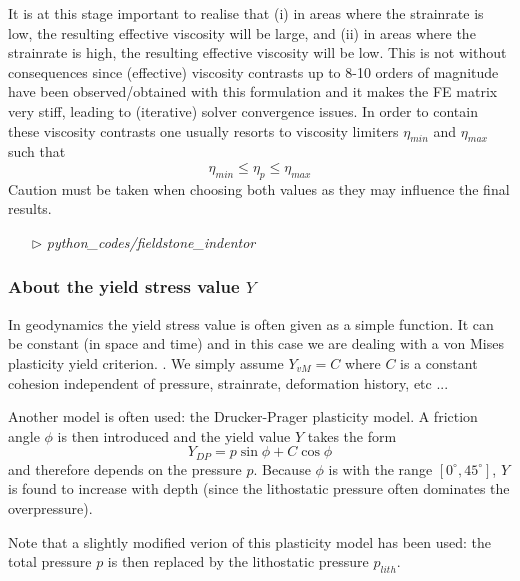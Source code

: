 It is at this stage important to realise that (i) in areas where the strainrate is low, the resulting effective viscosity will be large, and 
(ii) in areas where the strainrate is high, the resulting effective viscosity will be low. This is not without consequences since 
(effective) viscosity contrasts up to 8-10 orders of magnitude have been observed/obtained with this formulation and it makes the FE 
matrix very stiff, leading to (iterative) solver convergence issues.
In order to contain these viscosity contrasts one usually resorts to viscosity limiters $\eta_{min}$ and $\eta_{max}$ such that 
\[
\eta_{min} \leq \eta_p \leq \eta_{max}
\]
Caution must be taken when choosing both values as they may influence the final results.


\begin{mdframed}[backgroundcolor=green!5]
\begin{itemize}
\item[$\triangleright$] {\sl python\_codes/fieldstone\_indentor}
\end{itemize}
\end{mdframed}


\subsubsection{About the yield stress value $Y$}

In geodynamics the yield stress value is often given as a simple function. 
It can be constant (in space and time) and in this case we are dealing with a von Mises plasticity yield criterion. 
. We simply assume $Y_{vM}=C$ where $C$ is a constant cohesion independent of pressure, strainrate,
deformation history, etc ... 

Another model is often used: the Drucker-Prager plasticity model. 
A friction angle $\phi$ is then introduced and the yield value $Y$ takes the form
\[
Y_{DP}=p \sin\phi + C \cos \phi
\]
and therefore depends on the pressure $p$. Because $\phi$ is with the range $[0^\circ,45^\circ]$, $Y$ is
found to increase with depth (since the lithostatic pressure often dominates the overpressure).

Note that a slightly modified verion of this plasticity model has been used: the total pressure $p$
is then replaced by the lithostatic pressure $p_{lith}$.




